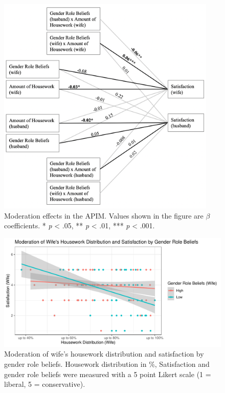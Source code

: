 \documentclass[
  man,floatsintext]{apa6}
\begin{document}
\begin{figure}
\includegraphics[width=4.11in]{moderation} \caption{Moderation effects in the APIM. Values shown in the figure are \(\beta\) coefficients.
* \emph{p} \textless{} .05, ** \emph{p} \textless{} .01, *** \emph{p} \textless{} .001.}\label{fig:unnamed-chunk-54}
\end{figure}



\begin{figure}
\centering
\includegraphics{Final_Paper_files/figure-latex/unnamed-chunk-57-1.pdf}
\caption{\label{fig:unnamed-chunk-57}Moderation of wife's housework distribution and satisfaction by gender role beliefs. Housework distribution in \%, Satisfaction and gender role beliefs were measured with a 5 point Likert scale (1 = liberal, 5 = conservative).}
\end{figure}
\end{document}
